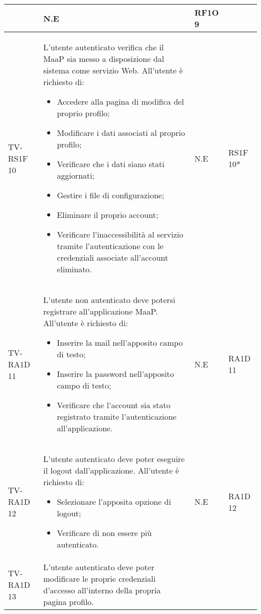 \begin{center}
\begin{longtable}{| p{3cm} | p{6cm} | p{1.5cm} | p{2cm} | }
\begin{itemize}
\end{itemize} & N.E & RF1O 9\newline  \\ \hline 
				TV-RS1F 10 & 
				L'utente autenticato verifica che il \glossario{framework} MaaP sia messo a disposizione dal sistema \glossario{MaaS} come servizio Web.
\newline
All'utente è richiesto di:
\begin{itemize}
\item Accedere alla pagina di modifica del proprio profilo;
\item Modificare i dati associati al proprio profilo;
\item Verificare che i dati siano stati aggiornati;
\item Gestire i file di configurazione;
\item Eliminare il proprio account;
\item Verificare l'inaccessibilità al servizio tramite l'autenticazione con le credenziali associate all'account eliminato.
\end{itemize} & N.E & RS1F 10* \newline  \\ \hline 
				TV-RA1D 11 & 
				L'utente non autenticato deve potersi registrare all'applicazione MaaP.
\newline
All'utente è richiesto di:
\begin{itemize}
\item Inserire la mail nell'apposito campo di testo;
\item Inserire la password nell'apposito campo di testo;
\item Verificare che l'account sia stato registrato tramite l'autenticazione all'applicazione.
\end{itemize} & N.E & RA1D 11\newline  \\ \hline 
				TV-RA1D 12 & 
				L'utente autenticato deve poter eseguire il logout dall'applicazione.
\newline
All'utente è richiesto di:
\begin{itemize}
\item Selezionare l'apposita opzione di logout;
\item Verificare di non essere più autenticato.
\end{itemize} & N.E & RA1D 12\newline  \\ \hline 
				TV-RA1D 13 & 
				L'utente autenticato deve poter modificare le proprie credenziali d'accesso all'interno della propria pagina profilo.

\end{longtable}
\end{center}
